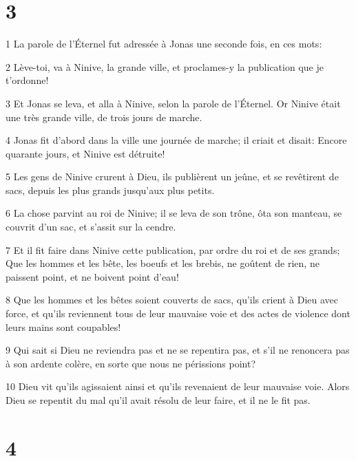 \chapter{3}

\par 1 La parole de l'Éternel fut adressée à Jonas une seconde fois, en ces mots:
\par 2 Lève-toi, va à Ninive, la grande ville, et proclames-y la publication que je t'ordonne!
\par 3 Et Jonas se leva, et alla à Ninive, selon la parole de l'Éternel. Or Ninive était une très grande ville, de trois jours de marche.
\par 4 Jonas fit d'abord dans la ville une journée de marche; il criait et disait: Encore quarante jours, et Ninive est détruite!
\par 5 Les gens de Ninive crurent à Dieu, ils publièrent un jeûne, et se revêtirent de sacs, depuis les plus grands jusqu'aux plus petits.
\par 6 La chose parvint au roi de Ninive; il se leva de son trône, ôta son manteau, se couvrit d'un sac, et s'assit sur la cendre.
\par 7 Et il fit faire dans Ninive cette publication, par ordre du roi et de ses grands; Que les hommes et les bête, les boeufs et les brebis, ne goûtent de rien, ne paissent point, et ne boivent point d'eau!
\par 8 Que les hommes et les bêtes soient couverts de sacs, qu'ils crient à Dieu avec force, et qu'ils reviennent tous de leur mauvaise voie et des actes de violence dont leurs mains sont coupables!
\par 9 Qui sait si Dieu ne reviendra pas et ne se repentira pas, et s'il ne renoncera pas à son ardente colère, en sorte que nous ne périssions point?
\par 10 Dieu vit qu'ils agissaient ainsi et qu'ils revenaient de leur mauvaise voie. Alors Dieu se repentit du mal qu'il avait résolu de leur faire, et il ne le fit pas.

\chapter{4}

